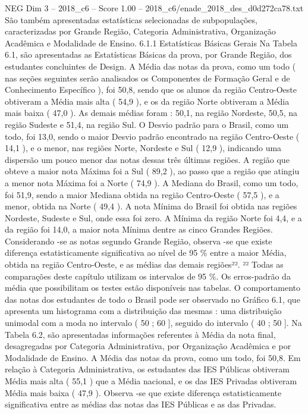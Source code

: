 \begin{textsample}{NEG Dim 3 – 2018\_c6 – Score 1.00 – 2018\_c6/enade\_2018\_des\_d0d272ca78.txt}
São também apresentadas estatísticas selecionadas de subpopulações, caracterizadas por Grande Região, Categoria Administrativa, Organização Acadêmica e Modalidade de Ensino. 6.1.1 Estatísticas Básicas Gerais Na Tabela 6.1, são apresentadas as Estatísticas Básicas da prova, por Grande Região, dos estudantes concluintes de Design.
A Média das notas da prova, como um todo ( nas seções seguintes serão analisados os Componentes de Formação Geral e de Conhecimento Específico ), foi 50,8, sendo que os alunos da região Centro-Oeste obtiveram a Média mais alta ( 54,9 ), e os da região Norte obtiveram a Média mais baixa ( 47,0 ).
As demais médias foram : 50,1, na região Nordeste, 50,5, na região Sudeste e 51,4, na região Sul.
O Desvio padrão para o Brasil, como um todo, foi 13,0, sendo o maior Desvio padrão encontrado na região Centro-Oeste ( 14,1 ), e o menor, nas regiões Norte, Nordeste e Sul ( 12,9 ), indicando uma dispersão um pouco menor das notas dessas três últimas regiões.
A região que obteve a maior nota Máxima foi a Sul ( 89,2 ), ao passo que a região que atingiu a menor nota Máxima foi a Norte ( 74,9 ).
A Mediana do Brasil, como um todo, foi 51,9, sendo a maior Mediana obtida na região Centro-Oeste ( 57,5 ), e a menor, obtida na Norte ( 49,4 ).
A nota Mínima do Brasil foi obtida nas regiões Nordeste, Sudeste e Sul, onde essa foi zero.
A Mínima da região Norte foi 4,4, e a da região foi 14,0, a maior nota Mínima dentre as cinco Grandes Regiões.
Considerando -se as notas segundo Grande Região, observa -se que existe diferença estatisticamente significativa ao nível de 95 \% entre a maior Média, obtida na região Centro-Oeste, e as médias das demais regiões²². ²² Todas as comparações deste capítulo utilizam os intervalos de 95 \%.
Os erros-padrão da média que possibilitam os testes estão disponíveis nas tabelas.
O comportamento das notas dos estudantes de todo o Brasil pode ser observado no Gráfico 6.1, que apresenta um histograma com a distribuição das mesmas : uma distribuição unimodal com a moda no intervalo ( 50 ; 60 ], seguido do intervalo ( 40 ; 50 ].
Na Tabela 6.2, são apresentadas informações referentes à Média da nota final, desagregadas por Categoria Administrativa, por Organização Acadêmica e por Modalidade de Ensino.
A Média das notas da prova, como um todo, foi 50,8.
Em relação à Categoria Administrativa, os estudantes das IES Públicas obtiveram Média mais alta ( 55,1 ) que a Média nacional, e os das IES Privadas obtiveram Média mais baixa ( 47,9 ).
Observa -se que existe diferença estatisticamente significativa entre as médias das notas das IES Públicas e as das Privadas.

\end{textsample}
